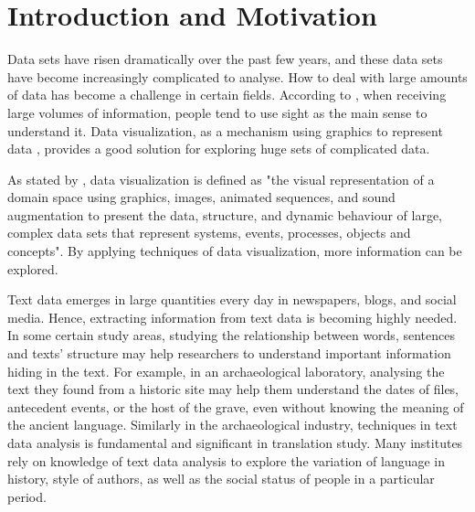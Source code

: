

\section{Introduction and Motivation}

Data sets have risen dramatically over the past few years, and these data sets have become increasingly complicated to analyse. How to deal with large amounts of data has become a challenge in certain fields\cite{Larameea}. According to \cite{Ward2015}, when receiving large volumes of information, people tend to use sight as the main sense to understand it. Data visualization, as a mechanism  using graphics to represent data \cite{Ward2015}, provides a good solution for exploring huge sets of complicated data.

As stated by \cite{Williams1995}, data visualization is defined as "the visual representation of a domain space using graphics, images, animated sequences, and sound augmentation to present the data, structure, and dynamic behaviour of large, complex data sets that represent systems, events, processes, objects and concepts"\cite{Williams1995}. By applying techniques of data visualization, more information can be explored.

Text data emerges in large quantities every day in newspapers, blogs, and social media. Hence, extracting information from text data is becoming highly needed. In some certain study areas, studying the relationship between words, sentences and texts’ structure may help researchers to understand important information hiding in the text. For example, in an archaeological laboratory, analysing the text they found from a historic site may help them understand the dates of files, antecedent events, or the host of the grave, even without knowing the meaning of the ancient language. Similarly in the archaeological industry, techniques in text data analysis is fundamental and significant in translation study. Many institutes rely on knowledge of text data analysis to explore the variation of language in history, style of authors, as well as the social status of people in a particular period. 

